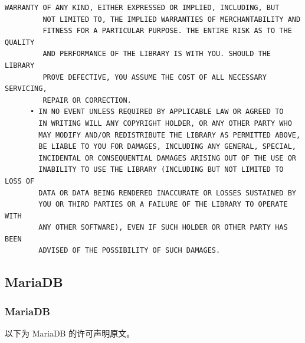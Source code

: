 \begin{lstlisting}[basicstyle=\ttfamily\footnotesize,breaklines=true]
         WARRANTY OF ANY KIND, EITHER EXPRESSED OR IMPLIED, INCLUDING, BUT
         NOT LIMITED TO, THE IMPLIED WARRANTIES OF MERCHANTABILITY AND
         FITNESS FOR A PARTICULAR PURPOSE. THE ENTIRE RISK AS TO THE QUALITY
         AND PERFORMANCE OF THE LIBRARY IS WITH YOU. SHOULD THE LIBRARY
         PROVE DEFECTIVE, YOU ASSUME THE COST OF ALL NECESSARY SERVICING,
         REPAIR OR CORRECTION.
      • IN NO EVENT UNLESS REQUIRED BY APPLICABLE LAW OR AGREED TO
        IN WRITING WILL ANY COPYRIGHT HOLDER, OR ANY OTHER PARTY WHO
        MAY MODIFY AND/OR REDISTRIBUTE THE LIBRARY AS PERMITTED ABOVE,
        BE LIABLE TO YOU FOR DAMAGES, INCLUDING ANY GENERAL, SPECIAL,
        INCIDENTAL OR CONSEQUENTIAL DAMAGES ARISING OUT OF THE USE OR
        INABILITY TO USE THE LIBRARY (INCLUDING BUT NOT LIMITED TO LOSS OF
        DATA OR DATA BEING RENDERED INACCURATE OR LOSSES SUSTAINED BY
        YOU OR THIRD PARTIES OR A FAILURE OF THE LIBRARY TO OPERATE WITH
        ANY OTHER SOFTWARE), EVEN IF SUCH HOLDER OR OTHER PARTY HAS BEEN
        ADVISED OF THE POSSIBILITY OF SUCH DAMAGES.
\end{lstlisting}

\subsection{MariaDB}
\subsubsection*{MariaDB}

以下为 MariaDB 的许可声明原文。


